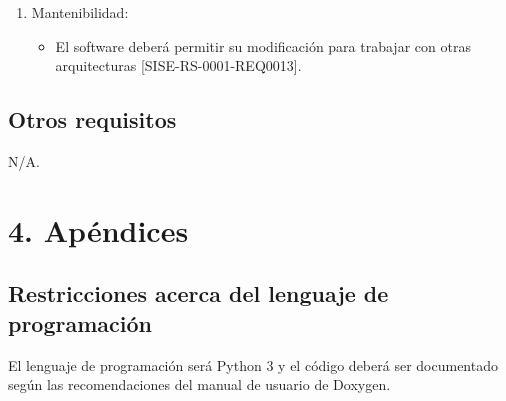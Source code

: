 \documentclass[
11pt, %
codirector, %
]{charter}
\begin{document}
\begin{enumerate}
	\item Mantenibilidad:
	\begin{itemize}
		\item El software deberá permitir su modificación para trabajar con otras arquitecturas [SISE-RS-0001-REQ0013].
	\end{itemize}
\end{enumerate}

\subsection{Otros requisitos}

N/A.

\section{4. Apéndices}
\label{sec:apendices}



\subsection{Restricciones acerca del lenguaje de programación}

El lenguaje de programación será Python 3 y el código deberá ser documentado según las recomendaciones del manual de usuario de Doxygen.
\end{document}
